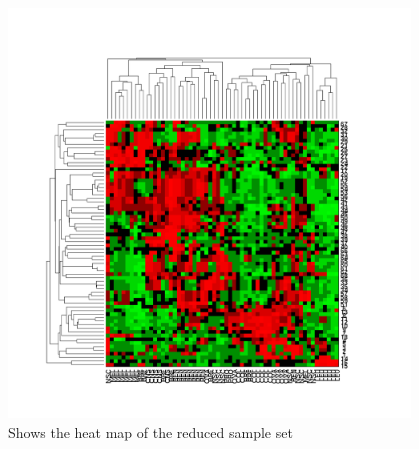 \begin{figure}[!htbp]
  \centering \includegraphics[width=0.95\textwidth]{./images/q35hm}
  \caption{Shows the heat map of the reduced sample set}
  \label{fig:q35hm}
\end{figure}
